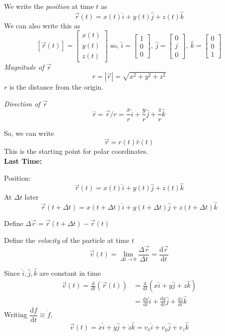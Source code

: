 \begin{definition} We write the \emph{position} at time $t$ as
\[\vec{r}(t) = x(t)\hat{i} + y(t)\hat{j} + z(t)\hat{k}\]
We can also write this as
\[[\vec{r}(t)] = \left[\begin{smallmatrix}
x(t)\\ y(t) \\ z(t)	
\end{smallmatrix}
 \right]\text{ so, } \hat{i} =  \left[\begin{smallmatrix}
1\\0\\0
\end{smallmatrix}
 \right],~ \hat{j} =  \left[\begin{smallmatrix}
0\\j\\0
\end{smallmatrix}
 \right],~ \hat{k} =  \left[\begin{smallmatrix}
0\\0\\1
\end{smallmatrix}
 \right]\]
 \textit{Magnitude of $\vec{r}$} \[r = |\vec{r}| = \sqrt{x^2 + y^2 + z^2}\]
$r$ is the distance from the origin.
 
 \textit{Direction of $\vec{r}$} \[\hat{r} = \vec{r}/r = \frac{x}{r}\hat{i} + \frac{y}{r}\hat{j} + \frac{z}{r}\hat{k}\]
  \end{definition}
  
 So, we can write 
 \[\vec{r} = r(t)\hat{r}(t)\]
 This is the starting point for polar coordinates.\\

 \textbf{Last Time:}
 \vspace*{100pt}



Position: 
\[\vec{r}(t) = x(t)\hat{i} + y(t)\hat{j} + z(t)\hat{k}\]
At $\Delta t$ later
\[\vec{r}(t + \Delta t) = x(t + \Delta t)\hat{i} + y(t + \Delta t)\hat{j} + z(t + \Delta t)\hat{k}\]

\begin{definition}
Define $\Delta \vec{r} = \vec{r}(t + \Delta t) - \vec{r}(t)$

Define the \emph{velocity} of the particle at time $t$
\[\vec{v}(t) = \lim_{\Delta t \to 0} \frac{\Delta \vec{r}}{\Delta t} = \frac{\mathrm{d}\vec{r}}{\mathrm{d}t}\]
\end{definition}

Since $\hat{i},\hat{j},\hat{k}$ are constant in time
\[\begin{aligned}
	\vec{v}(t) = \frac{\mathrm{d}}{\mathrm{d}t}(\vec{r}(t)) &= \frac{\mathrm{d}}{\mathrm{d}t}(x \hat{i} + y\hat{j} + z\hat{k})\\
	&= \frac{\mathrm{d}x}{\mathrm{d}t}\hat{i} + \frac{\mathrm{d}y}{\mathrm{d}t}\hat{j} + \frac{\mathrm{d}z}{\mathrm{d}t}\hat{k}
\end{aligned}
\]
Writing $\dfrac{\mathrm{d}f}{\mathrm{d}t} \equiv \dot{f}$, \[\vec{v}(t) = \dot{x}\hat{i} + \dot{y}\hat{j} + \dot{z}\hat{k} = v_x\hat{i} + v_y\hat{j} + v_z\hat{k}\]

